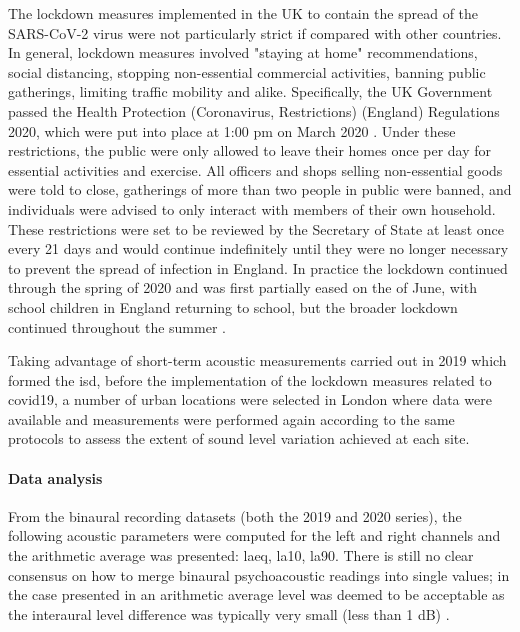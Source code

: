  The lockdown measures implemented in the UK to contain the spread of the SARS-CoV-2 virus were not particularly strict if compared with other countries. In general, lockdown measures involved "staying at home" recommendations, social distancing, stopping non-essential commercial activities, banning public gatherings, limiting traffic mobility and alike. Specifically, the UK Government passed the Health Protection (Coronavirus, Restrictions) (England) Regulations 2020, which were put into place at 1:00 pm on  March 2020 . Under these restrictions, the public were only allowed to leave their homes once per day for essential activities and exercise. All officers and shops selling non-essential goods were told to close, gatherings of more than two people in public were banned, and individuals were advised to only interact with members of their own household. These restrictions were set to be reviewed by the Secretary of State at least once every 21 days and would continue indefinitely until they were no longer necessary to prevent the spread of infection in England. In practice the lockdown continued through the spring of 2020 and was first partially eased on the  of June, with school children in England returning to school, but the broader lockdown continued throughout the summer \citep{Tong2021Increases}.

 Taking advantage of short-term acoustic measurements carried out in 2019 which formed the \gls{isd}, before the implementation of the lockdown measures related to \gls{covid19}, a number of urban locations were selected in London where data were available and measurements were performed again according to the same protocols to assess the extent of sound level variation achieved at each site. 

 \paragraph*{Data analysis}
 From the binaural recording datasets (both the 2019 and 2020 series), the following acoustic parameters were computed for the left and right channels and the arithmetic average was presented: \gls{laeq}, \gls{la10}, \gls{la90}. There is still no clear consensus on how to merge binaural psychoacoustic readings into single values; in the case presented in \citet{Aletta2020Assessing} an arithmetic average level was deemed to be acceptable as the interaural level difference was typically very small (less than 1 dB) .

